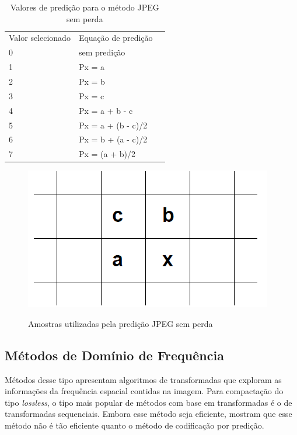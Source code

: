 \begin{table}[]
    \begin{center}
        \caption{\small Valores de predição para o método JPEG sem perda}
        \label{t.jpegstandart}
        \begin{tabular}{llr}
            Valor selecionado   & Equação de predição   \\
            0                   & sem predição          \\
            1                   & Px = a                \\
            2                   & Px = b                \\
            3                   & Px = c                \\
            4                   & Px = a + b - c        \\
            5                   & Px = a + (b - c)/2    \\
            6                   & Px = b + (a - c)/2    \\
            7                   & Px = (a + b)/2        \\
        \end{tabular}
    \end{center}
\end{table}

\begin{figure}[h]
\caption{\small Amostras utilizadas pela predição JPEG sem perda}
\centering
\includegraphics[scale=0.50]{figs/jpeg_standart.png}
\label{f.jpegstandart}
\end{figure}

\subsection{Métodos de Domínio de Frequência}
\label{ss.transformmethod}

Métodos desse tipo apresentam algoritmos de transformadas que exploram as informações da frequência espacial contidas na imagem. Para compactação do tipo {\em lossless}, o tipo mais popular de métodos com base em transformadas é o de transformadas sequenciais. Embora esse método seja eficiente, \citeauthor{kuduvalli} mostram que esse método não é tão eficiente quanto o método de codificação por predição.

